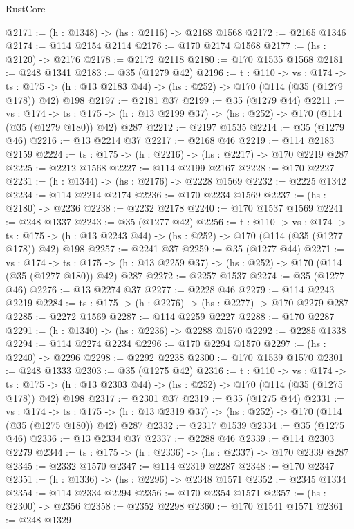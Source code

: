 \begin{lexlean}{RustCore}
\begin{coremodule}
@2171 := (h : @1348) -> (hs : @2116) -> @2168 @1568
@2172 := @2165 @1346
@2174 := @114 @2154 @2114
@2176 := @170 @2174 @1568
@2177 := (hs : @2120) -> @2176
@2178 := @2172 @2118
@2180 := @170 @1535 @1568
@2181 := @248 @1341
@2183 := @35 (@1279 @42)
@2196 := {t : @110} ->
  {vs : @174} ->
  {ts : @175} -> (h : @13 @2183 @44) -> (hs : @252) -> @170 (@114 (@35 (@1279 @178)) @42) @198
@2197 := @2181 @37
@2199 := @35 (@1279 @44)
@2211 := {vs : @174} ->
  {ts : @175} -> (h : @13 @2199 @37) -> (hs : @252) -> @170 (@114 (@35 (@1279 @180)) @42) @287
@2212 := @2197 @1535
@2214 := @35 (@1279 @46)
@2216 := @13 @2214 @37
@2217 := @2168 @46
@2219 := @114 @2183 @2159
@2224 := {ts : @175} -> (h : @2216) -> (hs : @2217) -> @170 @2219 @287
@2225 := @2212 @1568
@2227 := @114 @2199 @2167
@2228 := @170 @2227
@2231 := (h : @1344) -> (hs : @2176) -> @2228 @1569
@2232 := @2225 @1342
@2234 := @114 @2214 @2174
@2236 := @170 @2234 @1569
@2237 := (hs : @2180) -> @2236
@2238 := @2232 @2178
@2240 := @170 @1537 @1569
@2241 := @248 @1337
@2243 := @35 (@1277 @42)
@2256 := {t : @110} ->
  {vs : @174} ->
  {ts : @175} -> (h : @13 @2243 @44) -> (hs : @252) -> @170 (@114 (@35 (@1277 @178)) @42) @198
@2257 := @2241 @37
@2259 := @35 (@1277 @44)
@2271 := {vs : @174} ->
  {ts : @175} -> (h : @13 @2259 @37) -> (hs : @252) -> @170 (@114 (@35 (@1277 @180)) @42) @287
@2272 := @2257 @1537
@2274 := @35 (@1277 @46)
@2276 := @13 @2274 @37
@2277 := @2228 @46
@2279 := @114 @2243 @2219
@2284 := {ts : @175} -> (h : @2276) -> (hs : @2277) -> @170 @2279 @287
@2285 := @2272 @1569
@2287 := @114 @2259 @2227
@2288 := @170 @2287
@2291 := (h : @1340) -> (hs : @2236) -> @2288 @1570
@2292 := @2285 @1338
@2294 := @114 @2274 @2234
@2296 := @170 @2294 @1570
@2297 := (hs : @2240) -> @2296
@2298 := @2292 @2238
@2300 := @170 @1539 @1570
@2301 := @248 @1333
@2303 := @35 (@1275 @42)
@2316 := {t : @110} ->
  {vs : @174} ->
  {ts : @175} -> (h : @13 @2303 @44) -> (hs : @252) -> @170 (@114 (@35 (@1275 @178)) @42) @198
@2317 := @2301 @37
@2319 := @35 (@1275 @44)
@2331 := {vs : @174} ->
  {ts : @175} -> (h : @13 @2319 @37) -> (hs : @252) -> @170 (@114 (@35 (@1275 @180)) @42) @287
@2332 := @2317 @1539
@2334 := @35 (@1275 @46)
@2336 := @13 @2334 @37
@2337 := @2288 @46
@2339 := @114 @2303 @2279
@2344 := {ts : @175} -> (h : @2336) -> (hs : @2337) -> @170 @2339 @287
@2345 := @2332 @1570
@2347 := @114 @2319 @2287
@2348 := @170 @2347
@2351 := (h : @1336) -> (hs : @2296) -> @2348 @1571
@2352 := @2345 @1334
@2354 := @114 @2334 @2294
@2356 := @170 @2354 @1571
@2357 := (hs : @2300) -> @2356
@2358 := @2352 @2298
@2360 := @170 @1541 @1571
@2361 := @248 @1329

\end{coremodule}
\end{lexlean}
